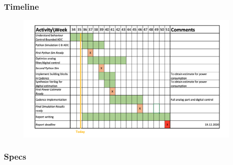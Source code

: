 \documentclass[xcolor={table}]{beamer}
\begin{document}
\begin{frame}
\frametitle{Timeline}
\begin{figure}[htbp]
\begin{center}
\includegraphics[width=\linewidth]{gantt}
\end{center}
\end{figure}
\end{frame}

\begin{frame}
\frametitle{Specs}
\begin{figure}[htbp]
\begin{center}

\end{center}
\end{figure}
\end{frame}
\end{document}
